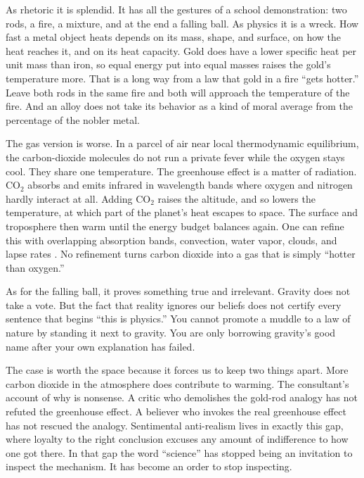 \documentclass[12pt,a4paper]{book}
\begin{document}
As rhetoric it is splendid. It has all the gestures of a school demonstration: two rods, a fire, a mixture, and at the end a falling ball. As physics it is a wreck. How fast a metal object heats depends on its mass, shape, and surface, on how the heat reaches it, and on its heat capacity. Gold does have a lower specific heat per unit mass than iron, so equal energy put into equal masses raises the gold's temperature more. That is a long way from a law that gold in a fire ``gets hotter.'' Leave both rods in the same fire and both will approach the temperature of the fire. And an alloy does not take its behavior as a kind of moral average from the percentage of the nobler metal.

The gas version is worse. In a parcel of air near local thermodynamic equilibrium, the carbon-dioxide molecules do not run a private fever while the oxygen stays cool. They share one temperature. The greenhouse effect is a matter of radiation. CO$_2$ absorbs and emits infrared in wavelength bands where oxygen and nitrogen hardly interact at all. Adding CO$_2$ raises the altitude, and so lowers the temperature, at which part of the planet's heat escapes to space. The surface and troposphere then warm until the energy budget balances again. One can refine this with overlapping absorption bands, convection, water vapor, clouds, and lapse rates \cite{IPCCWGI2021TechnicalSummary}. No refinement turns carbon dioxide into a gas that is simply ``hotter than oxygen.''

As for the falling ball, it proves something true and irrelevant. Gravity does not take a vote. But the fact that reality ignores our beliefs does not certify every sentence that begins ``this is physics.'' You cannot promote a muddle to a law of nature by standing it next to gravity. You are only borrowing gravity's good name after your own explanation has failed.

The case is worth the space because it forces us to keep two things apart. More carbon dioxide in the atmosphere does contribute to warming. The consultant's account of why is nonsense. A critic who demolishes the gold-rod analogy has not refuted the greenhouse effect. A believer who invokes the real greenhouse effect has not rescued the analogy. Sentimental anti-realism lives in exactly this gap, where loyalty to the right conclusion excuses any amount of indifference to how one got there. In that gap the word ``science'' has stopped being an invitation to inspect the mechanism. It has become an order to stop inspecting.
\end{document}
